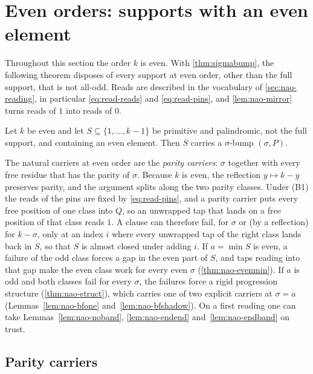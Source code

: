 \section{Even orders: supports with an even element}
\label{sec:notallodd}

Throughout this section the order $k$ is even. With \autoref{thm:sigmabump},
the following theorem disposes of every support at even order, other than the
full support, that is not all-odd. Reads are described in the vocabulary of
\autoref{sec:nao-reading}, in particular \eqref{eq:read-reads} and
\eqref{eq:read-pins}, and \autoref{lem:nao-mirror} turns reads of $1$ into
reads of $0$.

\begin{theorem}
\label{thm:notallodd}
Let $k$ be even and let $S\subseteq\{1,\dots,k-1\}$ be primitive and
palindromic, not the full support, and containing an even element. Then
$S$ carries a $\sigma$-bump $(\sigma,P)$.
\end{theorem}

The natural carriers at even order are the \emph{parity carriers}: $\sigma$
together with every free residue that has the parity of $\sigma$. Because $k$ is even, the reflection $y\mapsto k-y$ preserves
parity, and the argument splits along the two parity classes. Under (B1) the
reads of the pins are fixed by \eqref{eq:read-pins}, and a parity carrier puts every free position of one class
into $Q$, so an unwrapped tap that lands on a free position of that class
reads $1$. A clause can therefore fail, for $\sigma$ or (by a reflection) for
$k-\sigma$, only at an index $i$ where every unwrapped tap of the right class
lands back in $S$, so that $S$ is almost closed under adding $i$. If
$a=\min S$ is even, a failure of the odd class forces a gap in the even part
of $S$, and taps reading into that gap make the even class work for every
even $\sigma$ (\autoref{thm:nao-evenmin}). If $a$ is odd and both classes
fail for every $\sigma$, the failures force a rigid progression structure
(\autoref{thm:nao-struct}), which carries one of two explicit carriers at
$\sigma=a$ (Lemmas~\ref{lem:nao-bfone} and~\ref{lem:nao-bfshadow}). On a
first reading one can take Lemmas~\ref{lem:nao-noband},
\ref{lem:nao-endend} and~\ref{lem:nao-endband} on trust.

\subsection{Parity carriers}
\label{sec:nao-parity}

